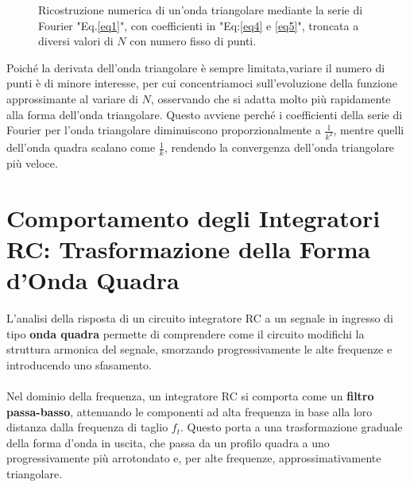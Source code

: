 \documentclass[10pt,a4paper]{article}
\begin{document}
\begin{figure}[H]
    \vspace{-0.3cm}
    
\caption{Ricostruzione numerica di un'onda triangolare mediante la serie di Fourier "Eq.\ref{eq1}", con coefficienti in "Eq:\ref{eq4} e \ref{eq5}", troncata a diversi valori di \(N\) con numero fisso di punti.}  
\label{fig:imgTr}  
\end{figure}
Poiché la derivata dell’onda triangolare è sempre limitata,variare il numero di punti è di minore interesse, per cui concentriamoci sull'evoluzione della funzione approssimante al variare di \( N \), osservando che si adatta molto più rapidamente alla forma dell’onda triangolare. Questo avviene perché i coefficienti della serie di Fourier per l’onda triangolare diminuiscono proporzionalmente a \( \frac{1}{k^2} \), mentre quelli dell’onda quadra scalano come \( \frac{1}{k} \), rendendo la convergenza dell’onda triangolare più veloce.

\section{Comportamento degli Integratori RC: Trasformazione della Forma d’Onda Quadra}

L’analisi della risposta di un circuito integratore RC a un segnale in ingresso di tipo \textbf{onda quadra} permette di comprendere come il circuito modifichi la struttura armonica del segnale, smorzando progressivamente le alte frequenze e introducendo uno sfasamento. \\\\ Nel dominio della frequenza, un integratore RC si comporta come un \textbf{filtro passa-basso}, attenuando le componenti ad alta frequenza in base alla loro distanza dalla frequenza di taglio \( f_t \). Questo porta a una trasformazione graduale della forma d’onda in uscita, che passa da un profilo quadra a uno progressivamente più arrotondato e, per alte frequenze, approssimativamente triangolare.  
\end{document}
